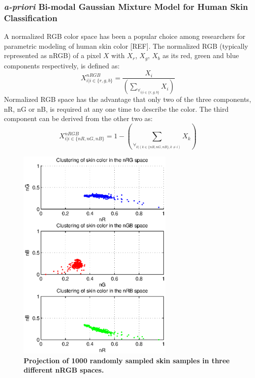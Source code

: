 \documentclass[times, 10pt,twocolumn]{article}
\begin{document}
\subsubsection{{\em a-priori} Bi-modal Gaussian Mixture Model
for Human Skin Classification}\label{Bi-ModGaussian} A normalized
RGB color space has been a popular choice among researchers for
parametric modeling of human skin color [REF]. The normalized RGB
(typically represented as nRGB) of a pixel $X$ with $X_r$, $X_g$,
$X_b$ as its red, green and blue components respectively, is defined
as:
\begin{equation}
X_{i|i \in \{r,g,b\}}^{nRGB} =
\frac{X_i}{\left(\sum\limits_{\forall_{i|i\in\{r,g,b\}}}X_i\right)}
\end{equation}
Normalized RGB space has the advantage that only two of the three
components, nR, nG or nB, is required at any one time to describe
the color. The third component can be derived from the other two as:
\begin{equation}
X_{i|i \in \{nR,nG,nB\}}^{nRGB} =  1 -\left(
\sum_{\forall_{k|(k\in\{nR,nG,nB\}, k \ne i)}}X_k \right)
\end{equation}

\vspace{-0.15in}
\begin{figure}[h]
\centering
\includegraphics[width=3in]{Figure3.eps}
\caption{{\bf {\selectfont Projection of 1000
randomly sampled skin samples in three different nRGB spaces.\\}}}
\label{Fig:nRGBProject}
\end{figure}
\end{document}
